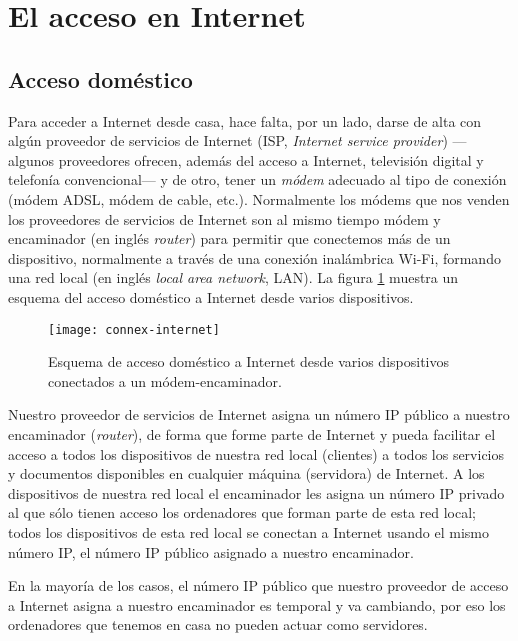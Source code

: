 \section{El acceso en Internet} \label{ss:adaI} 

\subsection{Acceso doméstico} Para acceder a Internet desde casa, hace falta, por un lado, darse de alta con algún proveedor de servicios de Internet (ISP, \emph{Internet service provider}) ---algunos proveedores ofrecen, además del acceso a Internet, televisión digital y telefonía convencional--- y de otro, tener un \emph{módem} adecuado al tipo de conexión (módem ADSL, módem de cable, etc.). Normalmente los módems que nos venden los proveedores de servicios de Internet son al mismo tiempo módem y encaminador (en inglés \emph{router}) para permitir que conectemos más de un dispositivo, normalmente a través de una conexión inalámbrica Wi-Fi, formando una red local (en inglés \emph{local area network}, LAN). La figura \ref{fg:accesinternet} muestra un esquema del acceso doméstico a Internet desde varios dispositivos. 

\begin{figure} \centering

\texttt{[image: connex-internet]} \caption{Esquema de acceso doméstico a Internet desde varios dispositivos conectados a un módem-encaminador.} \label{fg:accesinternet} \end{figure} 

Nuestro proveedor de servicios de Internet asigna un número IP público a nuestro encaminador (\emph{router}), de forma que forme parte de Internet y pueda facilitar el acceso a todos los dispositivos de nuestra red local (clientes) a todos los servicios y documentos disponibles en cualquier máquina (servidora) de Internet. A los dispositivos de nuestra red local el encaminador les asigna un número IP privado al que sólo tienen acceso los ordenadores que forman parte de esta red local; todos los dispositivos de esta red local se conectan a Internet usando el mismo número IP, el número IP público asignado a nuestro encaminador. 

En la mayoría de los casos, el número IP público que nuestro proveedor de acceso a Internet asigna a nuestro encaminador es temporal y va cambiando, por eso los ordenadores que tenemos en casa no pueden actuar como servidores. 

